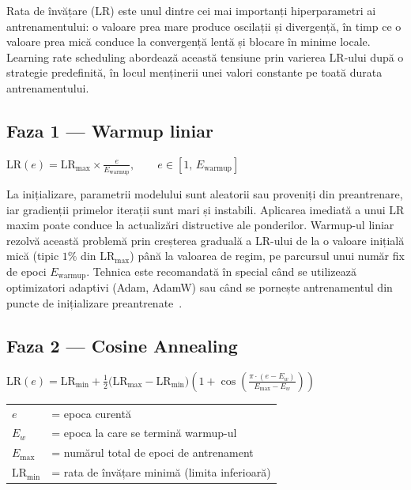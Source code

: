 \documentclass[12pt, a4paper]{report}
\newcommand{\formula}[1]{%
    \begin{center}
        \colorbox{codebackground}{%
            \parbox{0.88\textwidth}{\centering\vspace{4pt}$#1$\vspace{4pt}}%
        }
    \end{center}
}
\begin{document}
Rata de învățare ($\text{LR}$) este unul dintre cei mai importanți
hiperparametri ai antrenamentului: o valoare prea mare produce oscilații
și divergență, în timp ce o valoare prea mică conduce la convergență lentă
și blocare în minime locale. Learning rate scheduling abordează această
tensiune prin varierea $\text{LR}$-ului după o strategie predefinită,
în locul menținerii unei valori constante pe toată durata antrenamentului.

\subsection{Faza 1 — Warmup liniar}
\label{sec:warmup}

\formula{
    \text{LR}(e) = \text{LR}_{\max} \times \frac{e}{E_{\text{warmup}}},
    \qquad e \in [1,\, E_{\text{warmup}}]
}

La inițializare, parametrii modelului sunt aleatorii sau proveniți
din preantrenare, iar gradienții primelor iterații sunt mari și instabili.
Aplicarea imediată a unui $\text{LR}$ maxim poate conduce la actualizări
distructive ale ponderilor. Warmup-ul liniar rezolvă această problemă
prin creșterea graduală a $\text{LR}$-ului de la o valoare inițială
mică (tipic $1\%$ din $\text{LR}_{\max}$) până la valoarea de regim,
pe parcursul unui număr fix de epoci $E_{\text{warmup}}$.
Tehnica este recomandată în special când se utilizează optimizatori
adaptivi (Adam, AdamW) sau când se pornește antrenamentul din
puncte de inițializare preantrenate~\cite{goyal2017accurate}.

\subsection{Faza 2 — Cosine Annealing}
\label{sec:cosine}

\formula{
    \text{LR}(e) = \text{LR}_{\min} +
    \frac{1}{2}\bigl(\text{LR}_{\max} - \text{LR}_{\min}\bigr)
    \left(1 + \cos\!\left(\frac{\pi \cdot (e - E_w)}{E_{\max} - E_w}
    \right)\right)
}

\begin{center}
\begin{tabular}{ll}
    $e$           & = epoca curentă \\
    $E_w$         & = epoca la care se termină warmup-ul \\
    $E_{\max}$    & = numărul total de epoci de antrenament \\
    $\text{LR}_{\min}$ & = rata de învățare minimă (limita inferioară) \\
\end{tabular}
\end{center}
\end{document}
